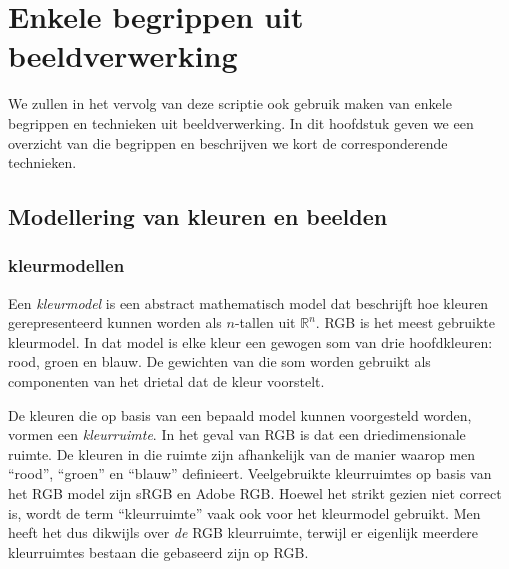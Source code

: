 \chapter{Enkele begrippen uit beeldverwerking}

We zullen in het vervolg van deze scriptie ook gebruik maken van enkele
begrippen en technieken uit beeldverwerking. In dit hoofdstuk geven we 
een overzicht van die begrippen en beschrijven we kort de corresponderende 
technieken.

\section{Modellering van kleuren en beelden}

\subsection{kleurmodellen}

Een \emph{kleurmodel} is een abstract mathematisch model dat beschrijft hoe kleuren gerepresenteerd 
kunnen worden als $n$-tallen uit $\mathbb{R}^n$. RGB is het meest gebruikte kleurmodel. In dat model is elke kleur
een gewogen som van drie hoofdkleuren: rood, groen en blauw. De gewichten van die som
worden gebruikt als componenten van het drietal dat de kleur voorstelt. 

De kleuren die op basis van een bepaald model kunnen voorgesteld worden, vormen een \emph{kleurruimte}. 
In het geval van RGB is dat een driedimensionale ruimte. De kleuren in die ruimte zijn afhankelijk
van de manier waarop men ``rood'', ``groen'' en ``blauw'' definieert. Veelgebruikte kleurruimtes 
op basis van het RGB model zijn sRGB en Adobe RGB.
Hoewel het strikt gezien niet correct is, wordt de term ``kleurruimte'' vaak ook voor het
kleurmodel gebruikt. Men heeft het dus dikwijls over \emph{de} RGB kleurruimte, terwijl er eigenlijk meerdere
kleurruimtes bestaan die gebaseerd zijn op RGB. 

